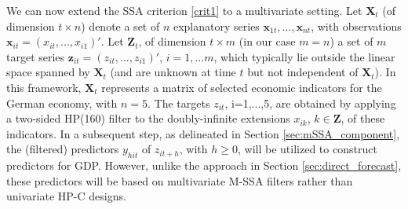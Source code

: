 \documentclass[11pt,a4paper]{article}
\begin{document}
We can now extend the SSA criterion \eqref{crit1} to a multivariate setting. Let $\mathbf{X}_t$ (of dimension $t\times n$) denote a set of $n$ explanatory series $\mathbf{x}_{1t},...,\mathbf{x}_{nt}$, with observations $\mathbf{x}_{it}=(x_{it},...,x_{i1})'$. Let $\mathbf{Z}_t$, of dimension $t\times m$ (in our case $m=n$) a set of $m$ target series $\mathbf{z}_{it}=(z_{it},...,z_{i1})'$, $i=1,...m$, which typically lie outside the linear space spanned by   $\mathbf{X}_t$ (and are unknown at time $t$ but not independent of $\mathbf{X}_t$). In this framework, $\mathbf{X}_t$ represents a matrix of selected economic indicators for the German economy, with $n=5$. The targets $z_{it}$, i=1,...,5,   are obtained by applying a two-sided HP(160) filter to the doubly-infinite extensions $x_{ik}$, $k\in \mathbf{Z}$, of these indicators. In a subsequent step, as delineated in Section \eqref{sec:mSSA_component}, the (filtered) predictors $y_{hit}$ of $z_{it+h}$, with $h\geq 0$,  will be utilized to construct predictors for GDP. However, unlike the approach in Section \eqref{sec:direct_forecast}, these predictors will be based on multivariate M-SSA filters rather than univariate HP-C designs. %
\end{document}
